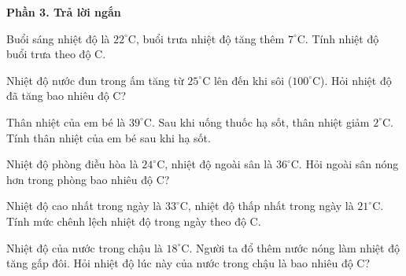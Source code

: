\textbf{Phần 3. Trả lời ngắn}

\begin{ex} %
Buổi sáng nhiệt độ là $22^\circ\text{C}$, buổi trưa nhiệt độ tăng thêm $7^\circ\text{C}$. Tính nhiệt độ buổi trưa theo độ C.
\end{ex}

\begin{ex} %
Nhiệt độ nước đun trong ấm tăng từ $25^\circ\text{C}$ lên đến khi sôi ($100^\circ\text{C}$). Hỏi nhiệt độ đã tăng bao nhiêu độ C?
\end{ex}

\begin{ex} %
Thân nhiệt của em bé là $39^\circ\text{C}$. Sau khi uống thuốc hạ sốt, thân nhiệt giảm $2^\circ\text{C}$. Tính thân nhiệt của em bé sau khi hạ sốt.
\end{ex}

\begin{ex} %
Nhiệt độ phòng điều hòa là $24^\circ\text{C}$, nhiệt độ ngoài sân là $36^\circ\text{C}$. Hỏi ngoài sân nóng hơn trong phòng bao nhiêu độ C?
\end{ex}

\begin{ex} %
Nhiệt độ cao nhất trong ngày là $33^\circ\text{C}$, nhiệt độ thấp nhất trong ngày là $21^\circ\text{C}$. Tính mức chênh lệch nhiệt độ trong ngày theo độ C.
\end{ex}

\begin{ex} %
Nhiệt độ của nước trong chậu là $18^\circ\text{C}$. Người ta đổ thêm nước nóng làm nhiệt độ tăng gấp đôi. Hỏi nhiệt độ lúc này của nước trong chậu là bao nhiêu độ C?
\end{ex}

